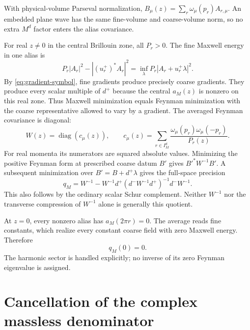 \documentclass[11pt]{article}
\theoremstyle{remark}
\newcommand{\diag}{\operatorname{diag}}
\begin{document}
With physical-volume Parseval normalization,
$B_\mu(z)=\sum_r\omega_\mu(p_r)A_{r,\mu}$.
An embedded plane wave has the same fine-volume and coarse-volume
norm, so no extra $M^d$ factor enters the alias covariance.

For real $z\ne0$ in the central Brillouin zone, all $P_r>0$.
The fine Maxwell energy in one alias is
\[
 P_r|A_r|^2-| (u_r^+)^*A_r|^2
 =\inf_\lambda P_r|A_r+u_r^+\lambda|^2.
\]
By \eqref{eq:gradient-symbol}, fine gradients produce precisely coarse
gradients. They produce every scalar multiple of $d^+$ because the
central $a_M(z)$ is nonzero on this real zone. Thus Maxwell minimization
equals Feynman minimization with the coarse representative allowed to
vary by a gradient. The averaged Feynman covariance is diagonal:
\begin{equation}\label{eq:feynman}
 W(z)=\diag(c_\mu(z)),\qquad
 c_\mu(z)=\sum_{r\in I_M^d}
       \frac{\omega_\mu(p_r)\omega_\mu(-p_r)}{P_r(z)}.
\end{equation}
For real momenta its numerators are squared absolute values.
Minimizing the positive Feynman form at prescribed coarse datum $B'$
gives $B'^*W^{-1}B'$. A subsequent minimization over
$B'=B+d^+\lambda$ gives the full-space precision
\begin{equation}\label{eq:quotient}
 q_M=W^{-1}-W^{-1}d^+
       (d^-W^{-1}d^+)^{-1}d^-W^{-1}.
\end{equation}
This also follows by the ordinary scalar Schur complement.
Neither $W^{-1}$ nor the transverse compression of $W^{-1}$ alone
is generally this quotient.

At $z=0$, every nonzero alias has $a_M(2\pi r)=0$.
The average reads fine constants, which realize every constant
coarse field with zero Maxwell energy. Therefore
\begin{equation}\label{eq:zero-mode}
 q_M(0)=0.
\end{equation}
The harmonic sector is handled explicitly; no inverse of its zero
Feynman eigenvalue is assigned.

\section{Cancellation of the complex massless denominator}
\end{document}
